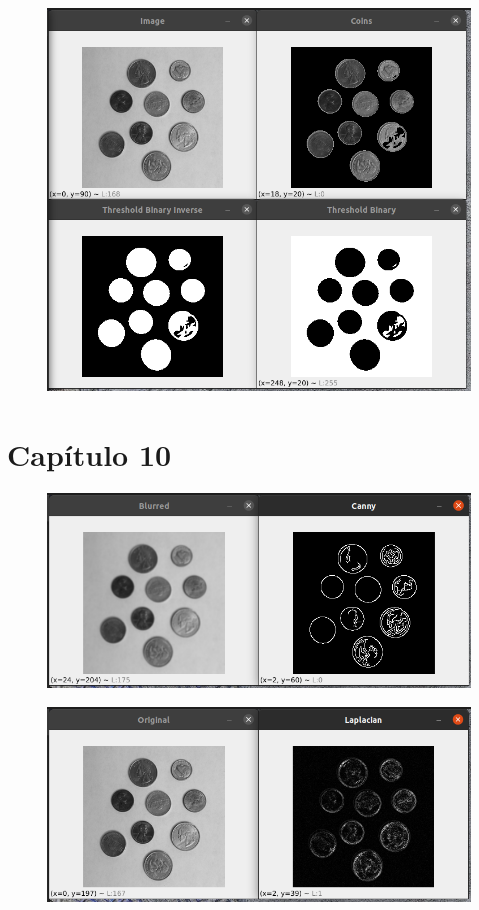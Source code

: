 \documentclass[12pt,letterpaper]{article}
\begin{document}
\begin{multicols}{2}
\begin{figure}[H]
\centering
\includegraphics[width = \columnwidth]{Resultado_ch9_3.png}
\end{figure}



\section{Capítulo 10}

\begin{figure}[H]
\centering
\includegraphics[width = \columnwidth]{Resultado_ch10_1.png}
\end{figure} 

\begin{figure}[H]
\centering
\includegraphics[width = \columnwidth]{Resultado_ch10_2.png}
\end{figure}



\end{multicols}
\end{document}
